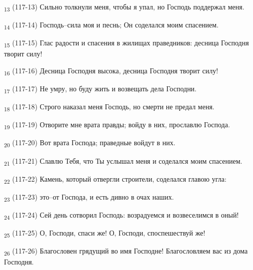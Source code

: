 \begin{tcolorbox}
\textsubscript{13} (117-13) Сильно толкнули меня, чтобы я упал, но Господь поддержал меня.
\end{tcolorbox}
\begin{tcolorbox}
\textsubscript{14} (117-14) Господь--сила моя и песнь; Он соделался моим спасением.
\end{tcolorbox}
\begin{tcolorbox}
\textsubscript{15} (117-15) Глас радости и спасения в жилищах праведников: десница Господня творит силу!
\end{tcolorbox}
\begin{tcolorbox}
\textsubscript{16} (117-16) Десница Господня высока, десница Господня творит силу!
\end{tcolorbox}
\begin{tcolorbox}
\textsubscript{17} (117-17) Не умру, но буду жить и возвещать дела Господни.
\end{tcolorbox}
\begin{tcolorbox}
\textsubscript{18} (117-18) Строго наказал меня Господь, но смерти не предал меня.
\end{tcolorbox}
\begin{tcolorbox}
\textsubscript{19} (117-19) Отворите мне врата правды; войду в них, прославлю Господа.
\end{tcolorbox}
\begin{tcolorbox}
\textsubscript{20} (117-20) Вот врата Господа; праведные войдут в них.
\end{tcolorbox}
\begin{tcolorbox}
\textsubscript{21} (117-21) Славлю Тебя, что Ты услышал меня и соделался моим спасением.
\end{tcolorbox}
\begin{tcolorbox}
\textsubscript{22} (117-22) Камень, который отвергли строители, соделался главою угла:
\end{tcolorbox}
\begin{tcolorbox}
\textsubscript{23} (117-23) это--от Господа, и есть дивно в очах наших.
\end{tcolorbox}
\begin{tcolorbox}
\textsubscript{24} (117-24) Сей день сотворил Господь: возрадуемся и возвеселимся в оный!
\end{tcolorbox}
\begin{tcolorbox}
\textsubscript{25} (117-25) О, Господи, спаси же! О, Господи, споспешествуй же!
\end{tcolorbox}
\begin{tcolorbox}
\textsubscript{26} (117-26) Благословен грядущий во имя Господне! Благословляем вас из дома Господня.
\end{tcolorbox}

